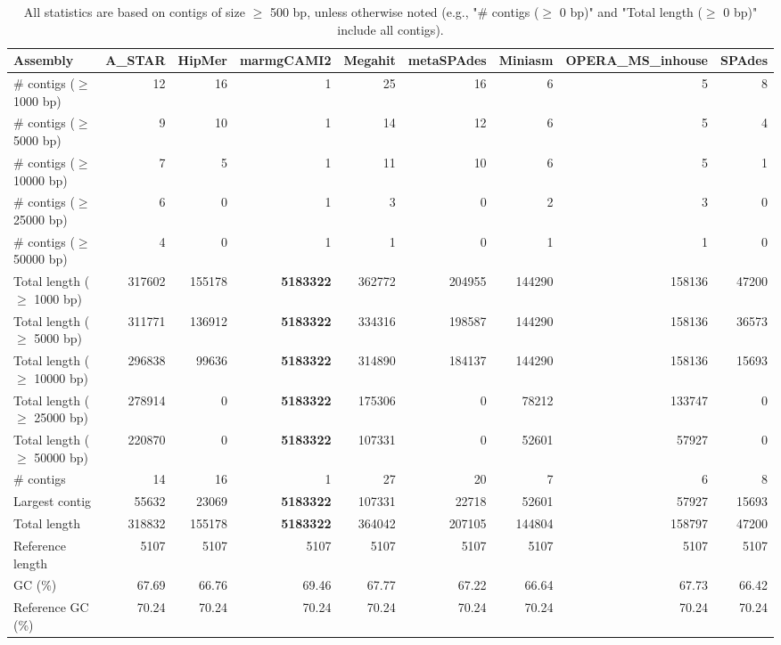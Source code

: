 \documentclass[12pt,a4paper]{article}
\begin{document}
\begin{table}[ht]
\begin{center}
\caption{All statistics are based on contigs of size $\geq$ 500 bp, unless otherwise noted (e.g., "\# contigs ($\geq$ 0 bp)" and "Total length ($\geq$ 0 bp)" include all contigs).}
\begin{tabular}{|l*{8}{|r}|}
\hline
Assembly & A\_STAR & HipMer & marmgCAMI2 & Megahit & metaSPAdes & Miniasm & OPERA\_MS\_inhouse & SPAdes \\ \hline
\# contigs ($\geq$ 1000 bp) & 12 & 16 & 1 & 25 & 16 & 6 & 5 & 8 \\ \hline
\# contigs ($\geq$ 5000 bp) & 9 & 10 & 1 & 14 & 12 & 6 & 5 & 4 \\ \hline
\# contigs ($\geq$ 10000 bp) & 7 & 5 & 1 & 11 & 10 & 6 & 5 & 1 \\ \hline
\# contigs ($\geq$ 25000 bp) & 6 & 0 & 1 & 3 & 0 & 2 & 3 & 0 \\ \hline
\# contigs ($\geq$ 50000 bp) & 4 & 0 & 1 & 1 & 0 & 1 & 1 & 0 \\ \hline
Total length ($\geq$ 1000 bp) & 317602 & 155178 & {\bf 5183322} & 362772 & 204955 & 144290 & 158136 & 47200 \\ \hline
Total length ($\geq$ 5000 bp) & 311771 & 136912 & {\bf 5183322} & 334316 & 198587 & 144290 & 158136 & 36573 \\ \hline
Total length ($\geq$ 10000 bp) & 296838 & 99636 & {\bf 5183322} & 314890 & 184137 & 144290 & 158136 & 15693 \\ \hline
Total length ($\geq$ 25000 bp) & 278914 & 0 & {\bf 5183322} & 175306 & 0 & 78212 & 133747 & 0 \\ \hline
Total length ($\geq$ 50000 bp) & 220870 & 0 & {\bf 5183322} & 107331 & 0 & 52601 & 57927 & 0 \\ \hline
\# contigs & 14 & 16 & 1 & 27 & 20 & 7 & 6 & 8 \\ \hline
Largest contig & 55632 & 23069 & {\bf 5183322} & 107331 & 22718 & 52601 & 57927 & 15693 \\ \hline
Total length & 318832 & 155178 & {\bf 5183322} & 364042 & 207105 & 144804 & 158797 & 47200 \\ \hline
Reference length & 5107 & 5107 & 5107 & 5107 & 5107 & 5107 & 5107 & 5107 \\ \hline
GC (\%) & 67.69 & 66.76 & 69.46 & 67.77 & 67.22 & 66.64 & 67.73 & 66.42 \\ \hline
Reference GC (\%) & 70.24 & 70.24 & 70.24 & 70.24 & 70.24 & 70.24 & 70.24 & 70.24 \\ \hline

\end{tabular}
\end{center}
\end{table}
\end{document}
